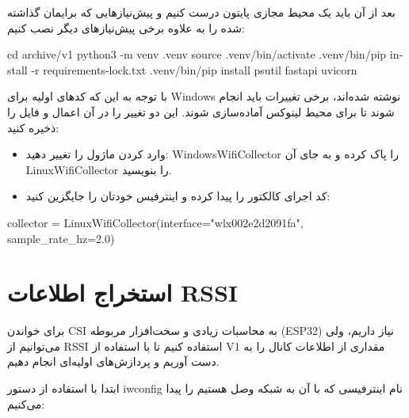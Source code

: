 \documentclass[12pt, a4paper]{article}
\newcommand{\lr}[1]{\foreignlanguage{english}{#1}}
\begin{document}
بعد از آن باید یک محیط مجازی پایتون درست کنیم و پیش‌نیازهایی که برایمان گذاشته شده را به علاوه برخی پیش‌نیازهای دیگر نصب کنیم:

\begin{otherlanguage}{english}
\begin{terminalbox}
cd archive/v1
python3 -m venv .venv
source .venv/bin/activate
.venv/bin/pip install -r requirements-lock.txt
.venv/bin/pip install psutil fastapi uvicorn
\end{terminalbox}
\end{otherlanguage}

با توجه به این که کدهای اولیه برای \lr{Windows} نوشته شده‌اند، برخی تغییرات باید انجام شوند تا برای محیط لینوکس آماده‌سازی شوند. این دو تغییر را در آن اعمال و فایل را ذخیره کنید:
\begin{itemize}
    \item وارد کردن ماژول را تغییر دهید: \lr{WindowsWifiCollector} را پاک کرده و به جای آن \lr{LinuxWifiCollector} را بنویسید.
    \item کد اجرای کالکتور را پیدا کرده و اینترفیس خودتان را جایگزین کنید:
\end{itemize}

\begin{otherlanguage}{english}
\begin{codebox}
collector = LinuxWifiCollector(interface="wlx002e2d2091fa", sample_rate_hz=2.0)
\end{codebox}
\end{otherlanguage}

\section{استخراج اطلاعات \lr{RSSI}}
برای خواندن \lr{CSI} به محاسبات زیادی و سخت‌افزار مربوطه (\lr{ESP32}) نیاز داریم، ولی می‌توانیم از \lr{RSSI} استفاده کنیم تا با استفاده از \lr{V1} مقداری از اطلاعات کانال را به دست آوریم و پردازش‌های اولیه‌ای انجام دهیم. 

ابتدا با استفاده از دستور \lr{iwconfig} نام اینترفیسی که با آن به شبکه وصل هستیم را پیدا می‌کنیم:

\begin{otherlanguage}{english}
\end{otherlanguage}
\end{document}
